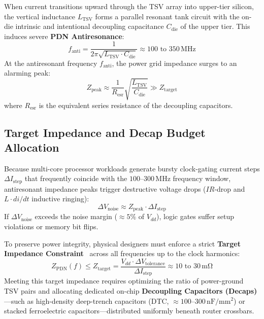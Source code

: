 When current transitions upward through the TSV array into upper-tier silicon, the vertical inductance $L_{\mathrm{TSV}}$ forms a parallel resonant tank circuit with the on-die intrinsic and intentional decoupling capacitance $C_{\mathrm{die}}$ of the upper tier. This induces severe \textbf{PDN Antiresonance}:
\begin{equation}
f_{\mathrm{anti}} = \frac{1}{2\pi \sqrt{L_{\mathrm{TSV}} \cdot C_{\mathrm{die}}}} \approx 100\text{ to }350\,\mathrm{MHz}
\label{eq:ch8_antiresonance_freq}
\end{equation}
At the antiresonant frequency $f_{\mathrm{anti}}$, the power grid impedance surges to an alarming peak:
\begin{equation}
Z_{\mathrm{peak}} \approx \frac{1}{R_{\mathrm{esr}}} \sqrt{\frac{L_{\mathrm{TSV}}}{C_{\mathrm{die}}}} \gg Z_{\mathrm{target}}
\label{eq:ch8_zpeak}
\end{equation}
where $R_{\mathrm{esr}}$ is the equivalent series resistance of the decoupling capacitors.

\subsection{Target Impedance and Decap Budget Allocation}
Because multi-core processor workloads generate bursty clock-gating current steps $\Delta I_{\mathrm{step}}$ that frequently coincide with the $100\text{--}300\,\mathrm{MHz}$ frequency window, antiresonant impedance peaks trigger destructive voltage drops ($IR$-drop and $L \cdot di/dt$ inductive ringing):
\begin{equation}
\Delta V_{\mathrm{noise}} \approx Z_{\mathrm{peak}} \cdot \Delta I_{\mathrm{step}}
\label{eq:ch8_vnoise}
\end{equation}
If $\Delta V_{\mathrm{noise}}$ exceeds the noise margin ($\approx 5\%$ of $V_{dd}$), logic gates suffer setup violations or memory bit flips.

To preserve power integrity, physical designers must enforce a strict \textbf{Target Impedance Constraint}~\cite{Smith1999} across all frequencies up to the clock harmonics:
\begin{equation}
Z_{\mathrm{PDN}}(f) \le Z_{\mathrm{target}} = \frac{V_{dd} \cdot \Delta V_{\mathrm{tolerance}}}{\Delta I_{\mathrm{step}}} \approx 10\text{ to }30\,\mathrm{m\Omega}
\label{eq:ch8_ztarget}
\end{equation}
Meeting this target impedance requires optimizing the ratio of power-ground TSV pairs and allocating dedicated on-chip \textbf{Decoupling Capacitors (Decaps)}—such as high-density deep-trench capacitors (DTC, $\approx 100\text{--}300\,\mathrm{nF/mm^2}$) or stacked ferroelectric capacitors—distributed uniformly beneath router crossbars.

